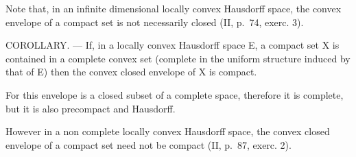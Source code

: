 Note that, in an infinite dimensional locally convex Hausdorff space, the convex envelope of a compact set is not necessarily closed (II, p.~74, exerc. 3).

COROLLARY. --- If, in a locally convex Hausdorff space E, a compact set X is contained in a complete convex set (complete in the uniform structure induced by that of E) then the convex closed envelope of X is compact.

For this envelope is a closed subset of a complete space, therefore it is complete, but it is also precompact and Hausdorff.

However in a non complete locally convex Hausdorff space, the convex closed envelope of a compact set need not be compact (II, p.~87, exerc. 2).

